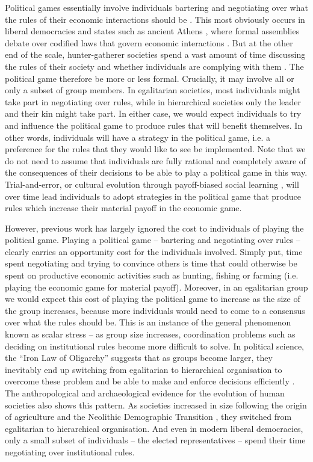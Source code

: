 \documentclass{rstb}
\begin{document}
\begin{linenumbers}
Political games essentially involve individuals bartering and negotiating over what the rules of their economic interactions should be \cite{Powers:2016:a}. This most obviously occurs in liberal democracies and states such as ancient Athens \cite{Ober:2008:a}, where formal assemblies debate over codified laws that govern economic interactions \cite{Reiter:1996:a}. But at the other end of the scale, hunter-gatherer societies spend a vast amount of time discussing the rules of their society and whether individuals are complying with them \cite{Boehm:1999:a}. The political game therefore be more or less formal. Crucially, it may involve all or only a subset of group members. In egalitarian societies, most individuals might take part in negotiating over rules, while in hierarchical societies only the leader and their kin might take part. In either case, we would expect individuals to try and influence the political game to produce rules that will benefit themselves. In other words, individuals will have a strategy in the political game, i.e. a preference for the rules that they would like to see be implemented. Note that we do not need to assume that individuals are fully rational and completely aware of the consequences of their decisions to be able to play a political game in this way. Trial-and-error, or cultural evolution through payoff-biased social learning \cite{Boyd:1985:a}, will over time lead individuals to adopt strategies in the political game that produce rules which increase their material payoff in the economic game. 

However, previous work has largely ignored the cost to individuals of playing the political game. Playing a political game -- bartering and negotiating over rules -- clearly carries an opportunity cost for the individuals involved. Simply put, time spent negotiating and trying to convince others is time that could otherwise be spent on productive economic activities such as hunting, fishing or farming (i.e. playing the economic game for material payoff). Moreover, in an egalitarian group we would expect this cost of playing the political game to increase as the size of the group increases, because more individuals would need to come to a consensus over what the rules should be. This is an instance of the general phenomenon known as scalar stress \cite{Johnson:1982:a} -- as group size increases, coordination problems such as deciding on institutional rules become more difficult to solve. In political science, the ``Iron Law of Oligarchy'' suggests that as groups become larger, they inevitably end up switching from egalitarian to hierarchical organisation to overcome these problem and be able to make and enforce decisions efficiently \cite{Michels:1911:a}. The anthropological and archaeological evidence for the evolution of human societies also shows this pattern. As societies increased in size following the origin of agriculture and the Neolithic Demographic Transition \cite{Bocquet-Appel:2011:a}, they switched from egalitarian to hierarchical organisation. And even in modern liberal democracies, only a small subset of individuals -- the elected representatives -- spend their time negotiating over institutional rules.


\end{linenumbers}
\end{document}
